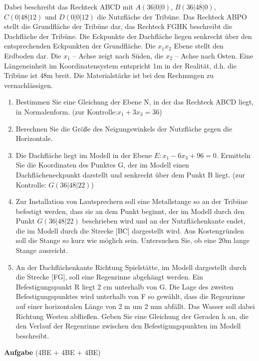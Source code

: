 \documentclass[a4paper,12pt]{article}
\newcounter{aufgabencounter}
\newcommand{\aufgabeNr}{\stepcounter{aufgabencounter}{\theaufgabencounter}}
\newcommand{\Aufgabe}[1]{
  {
  \vspace*{0.5cm}
  \textsf{\textbf{Aufgabe \aufgabeNr} #1}
  \vspace*{0.2cm}
  
  }
}
\begin{document}
Dabei beschreibt das Rechteck ABCD mit
  $A (36|0|0)$, $ B (36|48|0)$, $C (0|48|12)$ und $ D (0|0|12) $
die Nutzfläche der Tribüne. Das Rechteck ABPO stellt die Grundfläche der Tribüne dar, das
Rechteck FGHK beschreibt die Dachfläche der Tribüne. Die Eckpunkte der Dachfläche liegen
senkrecht über den entsprechenden Eckpunkten der Grundfläche.
Die $x_1x_2 $  Ebene stellt den Erdboden dar. Die $ x_1$ – Achse zeigt nach Süden, die $x_2$ – Achse nach
Osten. Eine Längeneinheit im Koordinatensystem entspricht 1m in der Realität, d.h. die Tribüne ist
48m breit. Die Materialstärke ist bei den Rechnungen zu vernachlässigen.
\begin{enumerate}[label={\alph*)}]
\item  Bestimmen Sie eine Gleichung der Ebene N, in der das Rechteck ABCD liegt, in
Normalenform. (zur Kontrolle:$ x_1 + 3x_3 = 36 $)
\item Berechnen Sie die Größe des Neigungswinkels der Nutzfläche gegen die Horizontale.
\item Die Dachfläche liegt im Modell in der Ebene $E: x_1 - 6x_3 + 96 = 0.$
Ermitteln Sie die Koordinaten des Punktes G, der im Modell einen Dachflächeneckpunkt
darstellt und senkrecht über dem Punkt B liegt. (zur Kontrolle: $G (36|48|22)$)
\item Zur Installation von Lautsprechern soll eine Metallstange so an der Tribüne befestigt
werden, dass sie an dem Punkt beginnt, der im Modell durch den Punkt $G (36|48|22)$  beschrieben wird
und an der Nutzflächenkante endet, die im Modell durch die Strecke [BC] dargestellt wird.
Aus Kostengründen soll die Stange so kurz wie möglich sein. Untersuchen Sie, ob eine 20m
lange Stange ausreicht.
\item An der Dachflächenkante Richtung Spielstätte, im Modell dargestellt durch die Strecke
[FG], soll eine Regenrinne abgehängt werden. Ein Befestigungspunkt R liegt 2 cm
unterhalb von G. Die Lage des zweiten Befestigungspunktes wird unterhalb von F so
gewählt, dass die Regenrinne auf einer horizontalen Länge von 2 m um 2 mm abfällt. Das
Wasser soll dabei Richtung Westen abfließen. Geben Sie eine Gleichung der Geraden h an,
die den Verlauf der Regenrinne zwischen den Befestigungspunkten im Modell beschreibt.
\end{enumerate}
\vspace{0,8cm}


\Aufgabe{(4BE + 4BE + 4BE)}
\end{document}
